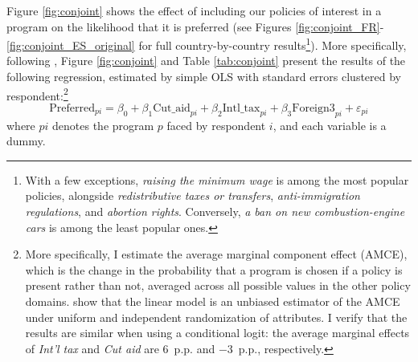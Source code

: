 \documentclass[12pt,english]{article}
\begin{document}
\begin{bibunit}
Figure \ref{fig:conjoint} shows the effect of including our policies of interest in a program on the likelihood that it is preferred (see Figures \ref{fig:conjoint_FR}-\ref{fig:conjoint_ES_original} for full country-by-country results\footnote{With a few exceptions, \textit{raising the minimum wage} is among the most popular policies, alongside \textit{redistributive taxes or transfers}, \textit{anti-immigration regulations}, and \textit{abortion rights}. 
Conversely, \textit{a ban on new combustion-engine cars} is among the least popular ones.}). 
More specifically, following \cite{hainmueller_causal_2014}, Figure \ref{fig:conjoint} and Table \ref{tab:conjoint} present the results %
of the following regression, estimated by simple OLS with standard errors clustered by respondent:\footnote{More specifically, I estimate the average marginal component effect (AMCE), which is the change in the probability that a program is chosen if a policy is present rather than not, averaged across all possible values in the other policy domains. \cite{hainmueller_causal_2014} show that the linear model is an unbiased estimator of the AMCE under uniform and independent randomization of attributes. %
I verify that the results are similar when using a conditional logit: the average marginal effects of \textit{Int'l tax} and \textit{Cut aid} are 6~p.p. and $-$3~p.p., respectively.}
\begin{equation}\label{eq:conjoint}
\text{Preferred}_{pi} = \beta_0 + \beta_1 \text{Cut\_aid}_{pi} + \beta_2 \text{Intl\_tax}_{pi} + \beta_3 \text{Foreign3}_{pi} + \varepsilon_{pi}  
\end{equation}
where $pi$ denotes the %
program $p$ faced by respondent $i$, and each variable is a dummy. 


\end{bibunit}
\end{document}
